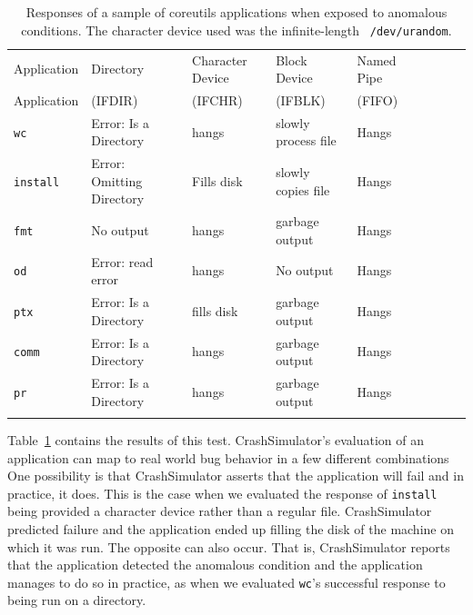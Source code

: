 \begin{table}[t]
    \scriptsize{}
    \begin{tabular}{l  l  l  l  l  l  l  l  l}
    \toprule{}
        Application         & Directory                 & Character Device & Block Device  & Named Pipe \\
        Application         & (IFDIR)                   & (IFCHR) & (IFBLK) & (FIFO) \\
\hline
        {\tt wc}            & Error: Is a Directory     & hangs       & slowly process file  & Hangs\\
        {\tt install}       & Error: Omitting Directory & Fills disk  & slowly copies file   & Hangs\\
        {\tt fmt}           & No output                 & hangs       & garbage output       & Hangs\\
        {\tt od}            & Error: read error         & hangs       & No output            & Hangs\\
        {\tt ptx}           & Error: Is a Directory     & fills disk  & garbage output       & Hangs\\
        {\tt comm}          & Error: Is a Directory     & hangs       & garbage output       & Hangs\\
        {\tt pr}            & Error: Is a Directory     & hangs       & garbage output       & Hangs\\
\hline
    \bottomrule{}
    \end{tabular}
    \caption{Responses of a sample of coreutils applications when exposed to
      anomalous conditions.  The character device used was the infinite-length {\tt
        /dev/urandom}.}
    \label{table:applicationresponses}
\end{table}


Table~\ref{table:applicationresponses} contains the results of this test.
CrashSimulator's evaluation of an application can map to real world bug behavior
in a few different combinations
One
possibility is that CrashSimulator asserts that the application will fail
and in practice, it does.  This is the case when we evaluated
the response of  {\tt install} being provided a character device
rather than a regular file. CrashSimulator predicted failure and the
application ended up filling the disk of the machine on which it was run.  The
opposite can also occur.  That is, CrashSimulator reports that the
application detected the anomalous condition and the application manages to
do so in practice,  as when we evaluated {\tt wc}'s successful response to
being run on a directory.

